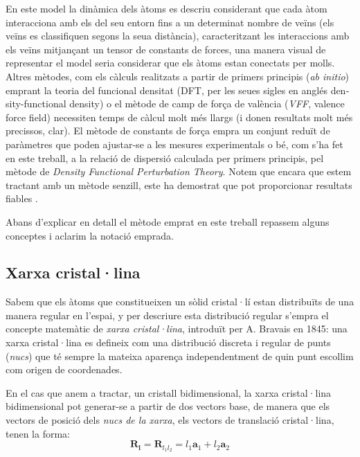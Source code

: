 \documentclass[12pt]{article} %
\let\vec\mathbf %
\begin{document}
En este model la dinàmica dels àtoms es descriu considerant que cada àtom interacciona amb els del seu entorn fins a un determinat nombre de veïns (els veïns es classifiquen segons la seua distància), caracteritzant les interaccions amb els veïns mitjançant un tensor de constants de forces, una manera visual de representar el model seria considerar que els àtoms estan conectats per molls. Altres mètodes, com els càlculs realitzats a partir de primers principis (\emph{ab initio}) emprant la teoria del funcional densitat (DFT, per les seues sigles en anglés \foreignlanguage{english}{density-functional density}) o el mètode de camp de força de valència (\emph{VFF}, \foreignlanguage{english}{valence force field}) necessiten temps de càlcul molt més llargs (i donen resultats molt més precissos, clar). El mètode de constants de força empra un conjunt reduït de paràmetres que poden ajustar-se a les mesures experimentals o bé, com s'ha fet en este treball, a la relació de dispersió calculada per primers principis, pel mètode de \emph{Density Functional Perturbation Theory}.  Notem que encara que estem tractant amb un mètode senzill, este ha demostrat que pot proporcionar resultats fiables \cite{wirtz04_phonon_disper_graph_revis}.

Abans d'explicar en detall el mètode emprat en este treball repassem alguns conceptes i aclarim la notació emprada.

\subsection{Xarxa cristal·lina}

Sabem que els àtoms que constitueixen un sòlid cristal·lí estan distribuïts de una manera regular en l'espai, y per descriure esta distribució regular s'empra el concepte matemàtic de \emph{xarxa cristal·lina}, introduït per A. Bravais en 1845: una xarxa cristal·lina es defineix com una distribució discreta i regular de punts (\emph{nucs}) que té sempre la mateixa aparença independentment de quin punt escollim com origen de coordenades.

En el cas que anem a tractar, un cristall bidimensional, la xarxa cristal·lina bidimensional pot generar-se a partir de dos vectors base, de manera que els vectors de posició dels \emph{nucs de la xarxa}, els vectors de translació cristal·lina,  tenen la forma:
\begin{equation}
 \vec R_\vec l=\vec R_{l_1 l_2}=l_1 \vec a_1 +l_2\vec a_2
\end{equation}
\end{document}
